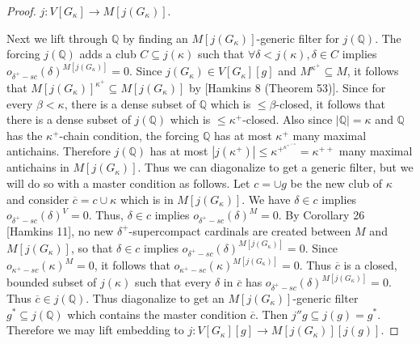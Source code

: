 \documentclass[10pt,leqno]{amsart}
\begin{document}
\begin{proof}
$j:V[G_{\kappa}] \to M[j(G_{\kappa})]$.

Next we lift through $\mathbb{Q}$ by finding an $M[j(G_{\kappa})]$-generic filter for $j(\mathbb{Q})$. The forcing $j(\mathbb{Q})$ adds a club $C \subseteq j(\kappa)$ such that $\forall \delta < j(\kappa), \delta \in C$ implies $o_{\delta^+-sc}(\delta)^{M[j(G_{\kappa})]} = 0$. Since $j(G_{\kappa}) \in V[G_{\kappa}][g]$ and $M^{\kappa^+} \subseteq M$, it follows that $M[j(G_{\kappa})]^{\kappa^+} \subseteq M[j(G_{\kappa})]$ by [Hamkins 8 (Theorem 53)]. Since for every $\beta < \kappa$, there is a dense subset of $\mathbb{Q}$ which is $\le \beta$-closed, it follows that there is a dense subset of $j(\mathbb{Q})$ which is $\le \kappa^+$-closed. Also since $|\mathbb{Q}| = \kappa$ and $\mathbb{Q}$ has the $\kappa^+$-chain condition, the forcing $\mathbb{Q}$ has at most $\kappa^+$ many maximal antichains. Therefore $j(\mathbb{Q})$ has at most $|j(\kappa^+)| \le \kappa^{+^{\kappa^{+^{<\kappa}}}} = \kappa^{++}$ many maximal antichains in $M[j(G_{\kappa})]$. Thus we can diagonalize to get a generic filter, but we will do so with a master condition as follows. Let $c = \cup g$ be the new club of $\kappa$ and consider $\overline{c} = c \cup \kappa$ which is in $M[j(G_{\kappa})]$. We have $\delta \in c$ implies $o_{\delta^+-sc}(\delta)^V = 0$. Thus, $\delta \in c$ implies $o_{\delta^+-sc}(\delta)^M = 0$. By Corollary 26 [Hamkins 11], no new $\delta^+$-supercompact cardinals are created between $M$ and $M[j(G_{\kappa})]$, so that $\delta \in c$ implies $o_{\delta^+-sc}(\delta)^{M[j(G_{\kappa})]} = 0$. Since $o_{\kappa^+-sc}(\kappa)^M = 0$, it follows that $o_{\kappa^+-sc}(\kappa)^{M[j(G_{\kappa})]} = 0$. Thus $\overline{c}$ is a closed, bounded subset of $j(\kappa)$ such that every $\delta$ in $\overline{c}$ has $o_{\delta^+-sc}(\delta)^{M[j(G_{\kappa})]} = 0$. Thus $\overline{c} \in j(\mathbb{Q})$. Thus diagonalize to get an $M[j(G_{\kappa})]$-generic filter $g^* \subseteq j(\mathbb{Q})$ which contains the master condition $\overline{c}$. Then $j''g \subseteq j(g) = g^*$. Therefore we may lift embedding to $j:V[G_{\kappa}][g] \to M[j(G_{\kappa})][j(g)]$.


\end{proof}
\end{document}
